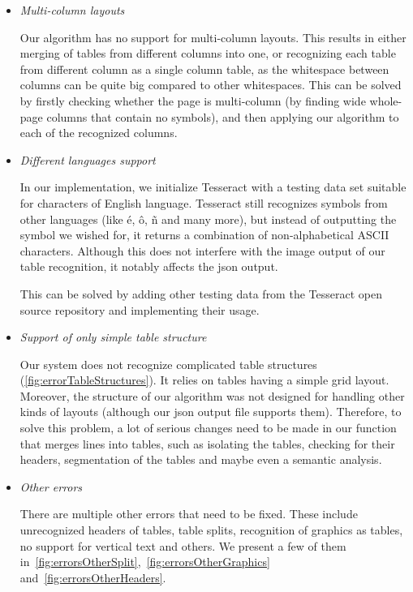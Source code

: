 \begin{itemize}
    \item \emph{Multi-column layouts}
    
    Our algorithm has no support for multi-column layouts. This results in either merging of tables from different columns into one, or recognizing each table from different column as a single column table, as the whitespace between columns can be quite big compared to other whitespaces. This can be solved by firstly checking whether the page is multi-column (by finding wide whole-page columns that contain no symbols), and then applying our algorithm to each of the recognized columns.
    
    \item \emph{Different languages support}
    
    In our implementation, we initialize Tesseract with a testing data set suitable for characters of English language. Tesseract still recognizes symbols from other languages (like é, ô, ñ and many more), but instead of outputting the symbol we wished for, it returns a combination of non-alphabetical ASCII characters. Although this does not interfere with the image output of our table recognition, it notably affects the json output.
    
    This can be solved by adding other testing data from the Tesseract open source repository and implementing their usage.
    
    \item \emph{Support of only simple table structure}
    
    Our system does not recognize complicated table structures (\cref{fig:errorTableStructures}). It relies on tables having a simple grid layout. Moreover, the structure of our algorithm was not designed for handling other kinds of layouts  (although our json output file supports them). Therefore, to solve this problem, a lot of serious changes need to be made in our function that merges lines into tables, such as isolating the tables, checking for their headers, segmentation of the tables and maybe even a semantic analysis.  
    
    \item \emph{Other errors}
    
    There are multiple other errors that need to be fixed. These include unrecognized headers of tables, table splits, recognition of graphics as tables, no support for vertical text and others. We present a few of them in~\cref{fig:errorsOtherSplit},~\cref{fig:errorsOtherGraphics} and~\cref{fig:errorsOtherHeaders}.
    
\end{itemize}

